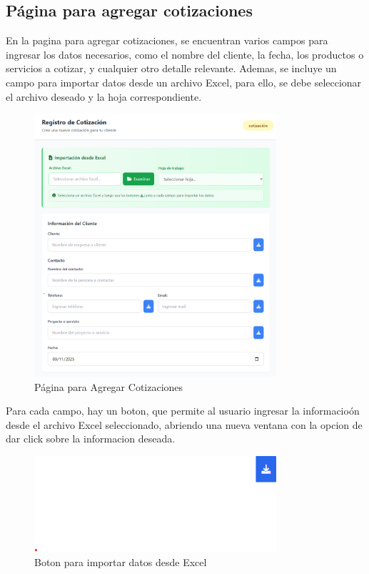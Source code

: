 \documentclass{Pretexto/bluereport}
\begin{document}
\subsection{Página para agregar cotizaciones}

En la pagina para agregar cotizaciones, se encuentran varios campos para ingresar los datos necesarios, como el nombre del cliente, la fecha, los productos o servicios a cotizar, y cualquier otro detalle relevante.
Ademas, se incluye un campo para importar datos desde un archivo Excel, para ello, se debe seleccionar el archivo deseado y la hoja correspondiente.

\begin{figure}[H]
    \centering
    \includegraphics[width=0.8\textwidth]{img/agregar_cotizacion_pagina.png}
    \caption{Página para Agregar Cotizaciones}
    \label{fig:agregar_cotizacion_pagina}
\end{figure}

Para cada campo, hay un boton, que permite al usuario ingresar la informacioón desde el archivo Excel seleccionado, abriendo una nueva ventana con la opcion de dar click sobre la informacion deseada.

\begin{figure}[H]
    \centering
    \includegraphics[width=0.8\textwidth]{img/boton_importacion.png}
    \caption{Boton para importar datos desde Excel}
    \label{fig:importar_datos}
\end{figure}
\end{document}
